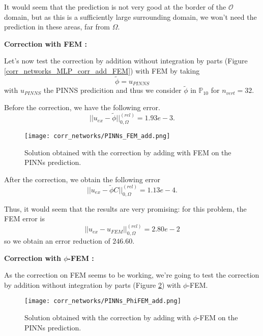 \begin{Rem}
	It would seem that the prediction is not very good at the border of the $\mathcal{O}$ domain, but as this is a sufficiently large surrounding domain, we won't need the prediction in these areas, far from $\Omega$.
\end{Rem}

\textbf{Correction with FEM :}

Let's now test the correction by addition without integration by parts (Figure \ref{corr_networks_MLP_corr_add_FEM}) with FEM by taking
\begin{equation*}
	\tilde{\phi}=u_{PINNS}
\end{equation*}
with $u_{PINNS}$ the PINNS predicition and thus we consider $\tilde{\phi}$ in $\mathbb{P}_{10}$ for $n_{vert}=32$.

Before the correction, we have the following error. 
\begin{equation*}
	||u_{ex}-\tilde{\phi}||_{0,\Omega}^{(rel)}=1.93e-3.
\end{equation*}

\begin{figure}[H]
	\centering
	\texttt{[image: corr\_networks/PINNs\_FEM\_add.png]}
	\caption{Solution obtained with the correction by adding with FEM on the PINNs prediction.}
	\label{corr_networks_PINNS_corr_add_FEM}
\end{figure}

After the correction, we obtain the following error 
\begin{equation*}
	||u_{ex}-\tilde{\phi}C||_{0,\Omega}^{(rel)}=1.13e-4.
\end{equation*}

Thus, it would seem that the results are very promising: for this problem, the FEM error is 
\begin{equation*}
	||u_{ex}-u_{FEM}||_{0,\Omega}^{(rel)}=2.80e-2
\end{equation*}
so we obtain an error reduction of $246.60$.

\textbf{Correction with $\phi$-FEM :}

As the correction on FEM seems to be working, we're going to test the correction by addition without integration by parts (Figure \ref{corr_networks_PINNs_corr_add_PhiFEM}) with $\phi$-FEM.

\begin{figure}[H]
	\centering
	\texttt{[image: corr\_networks/PINNs\_PhiFEM\_add.png]}
	\caption{Solution obtained with the correction by adding with $\phi$-FEM on the PINNs prediction.}
	\label{corr_networks_PINNs_corr_add_PhiFEM}
\end{figure}

